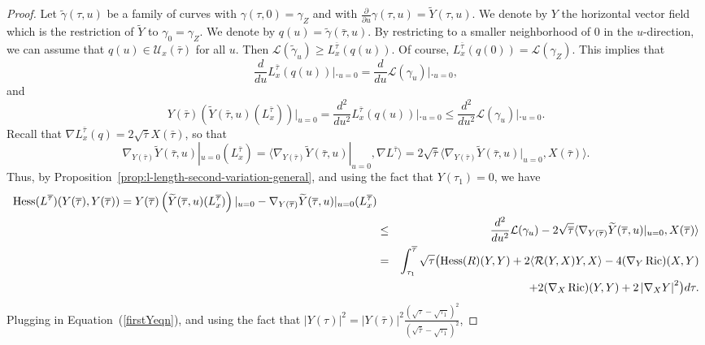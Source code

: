 \begin{proof}
\sketch

Let $\tilde\gamma(\tau,u)$ be a family  of curves with
$\gamma(\tau,0)=\gamma_Z$ and with $\frac{\partial}{\partial
u}\gamma(\tau,u)=\widetilde Y(\tau,u)$. We denote by $Y$ the
horizontal vector field which is the restriction of $\widetilde Y$
to $\gamma_0=\gamma_Z$. We denote by
$q(u)=\tilde\gamma(\bar\tau,u)$. By restricting to a smaller
neighborhood of $0$ in the $u$-direction, we can assume that
$q(u)\in {\mathcal U}_x(\bar\tau)$ for all $u$. Then ${\mathcal
L}(\tilde\gamma_u)\ge L_x^{\bar\tau}(q(u))$. Of course,
$L_x^{\bar\tau}(q(0))={\mathcal L}(\gamma_Z)$. This implies that
$$\frac{d}{d u}L_x^{\bar\tau}(q(u))\bigl|\bigr._{u=0}=
\frac{d}{du}{\mathcal L}(\gamma_u)\bigl|\bigr._{u=0},$$
 and
$$
Y(\bar\tau)(\widetilde
Y(\bar\tau,u)(L^{\bar\tau}_x))|_{u=0}=\frac{d^2}{du^2}L_x^{\bar\tau}(q(u))\bigl|\bigr._{u=0}\le
\frac{d^2}{du^2}{\mathcal L}(\gamma_u)\bigl|\bigr._{u=0}.$$
 Recall that
$\nabla L_x^{\bar\tau}(q) = 2\sqrt{\bar\tau}X(\bar\tau)$, so that
$$\nabla_{Y(\bar\tau)}\widetilde Y(\bar\tau,u)|_{u=0}(L_x^{\bar\tau})=
\langle \nabla_{Y(\bar\tau)}\widetilde Y(\bar\tau,u)|_{u=0},\nabla
L^{\bar\tau}\rangle = 2\sqrt{\bar\tau}\langle
\nabla_{Y(\bar\tau)}\widetilde
Y(\bar\tau,u)|_{u=0},X(\bar\tau)\rangle .$$ Thus, by
Proposition~\ref{prop:l-length-second-variation-general}, and using the fact that
$Y(\tau_1)=0$, we have
\begin{eqnarray*}
\operatorname{Hess}(L^{\overline\tau})(Y(\overline\tau),Y(\overline\tau))  =
Y(\overline\tau)\left(\widetilde
Y(\overline\tau,u)(L_x^{\overline\tau})\right)|_{u=0}-
\nabla_{Y(\overline\tau)}\widetilde Y(\overline\tau,u)|_{u=0}(L_x^{\overline\tau}) \\
& \le & \frac{d^2}{du^2}{\mathcal
L}(\gamma_u)-2\sqrt{\overline\tau}\langle
\nabla_{Y(\overline\tau)}\widetilde Y(\overline\tau,u)|_{u=0},X(\overline\tau)\rangle \\
 & = & \int_{\tau_1}^{\overline\tau}
\sqrt{\tau}\bigl(\operatorname{Hess}(R)(Y,Y) +
2\langle {\mathcal R}(Y,X)Y,X\rangle - 4(\nabla_{Y}\operatorname{Ric})(X,Y)\bigr. \\
& & \ \ \ \ \bigl.+ 2(\nabla_{X}\operatorname{Ric})(Y,Y) +
2\left\vert\nabla_XY\right\vert^2\bigr)d\tau.
\end{eqnarray*}
 Plugging in Equation~(\ref{firstYeqn}), and using the fact that
 $|Y(\tau)|^2=
|Y(\bar\tau)|^2\frac{(\sqrt{\tau}-\sqrt{\tau_1})^2}{(\sqrt{\bar\tau}-\sqrt{\tau_1})^2}$,

\end{proof}
